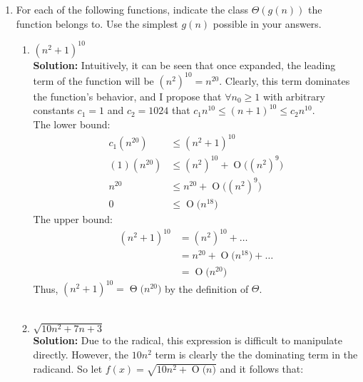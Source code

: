 \documentclass[11pts]{article}
\newcommand{\BigO}[1]{\ensuremath{\operatorname{O}\bigl(#1\bigr)}}
\newcommand{\BigTheta}[1]{\ensuremath{\operatorname{\Theta}\bigl(#1\bigr)}}
\begin{document}
\begin{enumerate}
  \item
  For each of the following functions, indicate the class
  $Θ(g(n))$ the function belongs to. Use the simplest $g(n)$ possible in your
  answers.

    \begin{enumerate}
      \item $ (n^{2}+1)^{10} $ \\

        \textbf{Solution:} Intuitively, it can be seen that once expanded,
        the leading term of the function will be
        $ (n^{2})^{10} = n^{20} $. Clearly, this term dominates the function's
        behavior, and I propose that $ \forall n_0 \ge 1$ with
        arbitrary constants $ c_1 = 1 $ and $ c_2 = 1024 $
        that $ c_1n^{10} \le (n + 1)^{10} \le c_2n^{10} $.\\

        The lower bound:
        \begin{align*}
          c_1(n^{20}) &\le (n^2 + 1)^{10} \\
          (1)(n^{20}) &\le (n^2)^{10} + \BigO{(n^2)^{9}} \\
               n^{20} &\le n^{20} + \BigO{(n^2)^{9}} \\
                    0 &\le \BigO{n^{18}} 
        \end{align*}
        The upper bound:
        \begin{align*}
          (n^2 + 1)^{10} &= (n^{2})^{10} + \ldots \\
                         &= n^{20} + \BigO{n^{18}} + \ldots \\
                         &= \BigO{n^{20}}
        \end{align*}
        Thus, $ (n^{2}+1)^{10} = \BigTheta{n^{20}} $ by the definition
        of $\Theta$.\\
        \\

      \item $ \sqrt{10n^{2}+7n+3} $ \\

        \textbf{Solution:} Due to the radical, this expression is difficult
        to manipulate directly. However, the $10n^2$ term is clearly the
        the dominating term in the radicand. So let
        $ f(x) = \sqrt{10n^2 + \BigO{n}} $ and it follows that:


\end{enumerate}
\end{enumerate}
\end{document}
